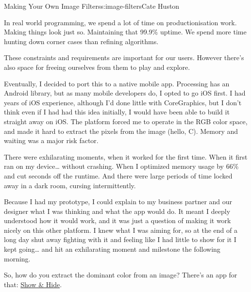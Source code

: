 \begin{aosachapter}{Making Your Own Image Filters}{s:image-filters}{Cate Huston}
\label{the-value-of-prototyping}

In real world programming, we spend a lot of time on productionisation
work. Making things look just so. Maintaining that 99.9\% uptime. We
spend more time hunting down corner cases than refining algorithms.

These constraints and requirements are important for our users. However
there's also space for freeing ourselves from them to play and explore.

Eventually, I decided to port this to a native mobile app. Processing
has an Android library, but as many mobile developers do, I opted to go
iOS first. I had years of iOS experience, although I'd done little with
CoreGraphics, but I don't think even if I had had this idea initially, I
would have been able to build it straight away on iOS. The platform
forced me to operate in the RGB color space, and made it hard to extract
the pixels from the image (hello, C). Memory and waiting was a major
risk factor.

There were exhilarating moments, when it worked for the first time. When
it first ran on my device\ldots{} without crashing. When I optimized
memory usage by 66\% and cut seconds off the runtime. And there were
large periods of time locked away in a dark room, cursing
intermittently.

Because I had my prototype, I could explain to my business partner and
our designer what I was thinking and what the app would do. It meant I
deeply understood how it would work, and it was just a question of
making it work nicely on this other platform. I knew what I was aiming
for, so at the end of a long day shut away fighting with it and feeling
like I had little to show for it I kept going\ldots{} and hit an
exhilarating moment and milestone the following morning.

So, how do you extract the dominant color from an image? There's an app
for that: \href{showandhide.com}{Show \& Hide}.

\end{aosachapter}
